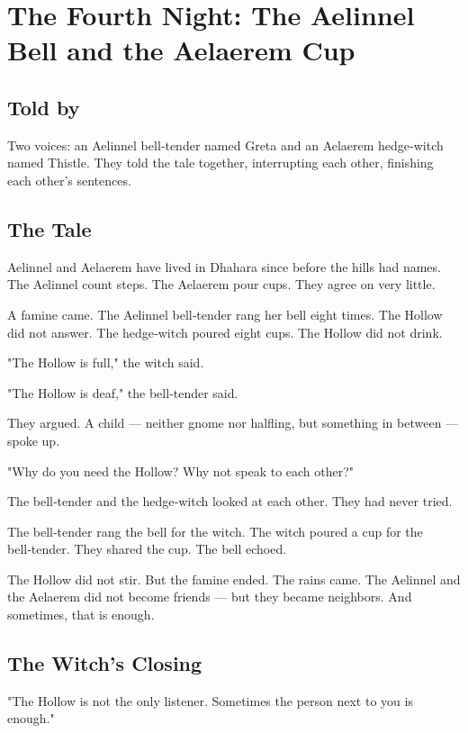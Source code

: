 \documentclass[10pt,twoside]{book}
\begin{document}
\chapter{The Fourth Night: The Aelinnel Bell and the Aelaerem Cup}

\section*{Told by}
Two voices: an Aelinnel bell‑tender named Greta and an Aelaerem hedge‑witch named Thistle. They told the tale together, interrupting each other, finishing each other's sentences.

\section*{The Tale}
Aelinnel and Aelaerem have lived in Dhahara since before the hills had names. The Aelinnel count steps. The Aelaerem pour cups. They agree on very little.

A famine came. The Aelinnel bell‑tender rang her bell eight times. The Hollow did not answer. The hedge‑witch poured eight cups. The Hollow did not drink.

"The Hollow is full," the witch said.

"The Hollow is deaf," the bell‑tender said.

They argued. A child --- neither gnome nor halfling, but something in between --- spoke up.

"Why do you need the Hollow? Why not speak to each other?"

The bell‑tender and the hedge‑witch looked at each other. They had never tried.

The bell‑tender rang the bell for the witch. The witch poured a cup for the bell‑tender. They shared the cup. The bell echoed.

The Hollow did not stir. But the famine ended. The rains came. The Aelinnel and the Aelaerem did not become friends --- but they became neighbors. And sometimes, that is enough.

\section*{The Witch's Closing}
"The Hollow is not the only listener. Sometimes the person next to you is enough."
\end{document}
